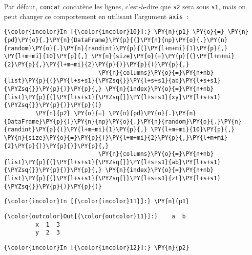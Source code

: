     Par défaut, \texttt{concat} concatène les lignes, c'est-à-dire que
\texttt{s2} sera sous \texttt{s1}, mais on peut changer ce comportement
en utilisant l'argument \texttt{axis}~:

    \begin{Verbatim}[commandchars=\\\{\},frame=single,framerule=0.3mm,rulecolor=\color{cellframecolor}]
{\color{incolor}In [{\color{incolor}10}]:} \PY{n}{p1} \PY{o}{=} \PY{n}{pd}\PY{o}{.}\PY{n}{DataFrame}\PY{p}{(}\PY{n}{np}\PY{o}{.}\PY{n}{random}\PY{o}{.}\PY{n}{randint}\PY{p}{(}\PY{l+m+mi}{1}\PY{p}{,} \PY{l+m+mi}{10}\PY{p}{,} \PY{n}{size}\PY{o}{=}\PY{p}{(}\PY{l+m+mi}{2}\PY{p}{,}\PY{l+m+mi}{2}\PY{p}{)}\PY{p}{)}\PY{p}{,}
                           \PY{n}{columns}\PY{o}{=}\PY{n+nb}{list}\PY{p}{(}\PY{l+s+s1}{\PYZsq{}}\PY{l+s+s1}{ab}\PY{l+s+s1}{\PYZsq{}}\PY{p}{)}\PY{p}{,} \PY{n}{index}\PY{o}{=}\PY{n+nb}{list}\PY{p}{(}\PY{l+s+s1}{\PYZsq{}}\PY{l+s+s1}{xy}\PY{l+s+s1}{\PYZsq{}}\PY{p}{)}\PY{p}{)}
         \PY{n}{p2} \PY{o}{=} \PY{n}{pd}\PY{o}{.}\PY{n}{DataFrame}\PY{p}{(}\PY{n}{np}\PY{o}{.}\PY{n}{random}\PY{o}{.}\PY{n}{randint}\PY{p}{(}\PY{l+m+mi}{1}\PY{p}{,} \PY{l+m+mi}{10}\PY{p}{,} \PY{n}{size}\PY{o}{=}\PY{p}{(}\PY{l+m+mi}{2}\PY{p}{,}\PY{l+m+mi}{2}\PY{p}{)}\PY{p}{)}\PY{p}{,}
                           \PY{n}{columns}\PY{o}{=}\PY{n+nb}{list}\PY{p}{(}\PY{l+s+s1}{\PYZsq{}}\PY{l+s+s1}{ab}\PY{l+s+s1}{\PYZsq{}}\PY{p}{)}\PY{p}{,} \PY{n}{index}\PY{o}{=}\PY{n+nb}{list}\PY{p}{(}\PY{l+s+s1}{\PYZsq{}}\PY{l+s+s1}{zt}\PY{l+s+s1}{\PYZsq{}}\PY{p}{)}\PY{p}{)}
\end{Verbatim}


    \begin{Verbatim}[commandchars=\\\{\},frame=single,framerule=0.3mm,rulecolor=\color{cellframecolor}]
{\color{incolor}In [{\color{incolor}11}]:} \PY{n}{p1}
\end{Verbatim}


\begin{Verbatim}[commandchars=\\\{\},frame=single,framerule=0.3mm,rulecolor=\color{cellframecolor}]
{\color{outcolor}Out[{\color{outcolor}11}]:}    a  b
         x  1  3
         y  2  3
\end{Verbatim}
            
    \begin{Verbatim}[commandchars=\\\{\},frame=single,framerule=0.3mm,rulecolor=\color{cellframecolor}]
{\color{incolor}In [{\color{incolor}12}]:} \PY{n}{p2}
\end{Verbatim}


